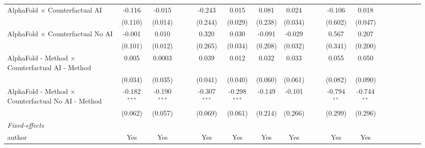 \begin{tabular}{lcccccccccccccccccc}
   AlphaFold $\times$ Counterfactual AI                       & -0.116         & -0.015         &     &     & -0.243         & 0.015          & 0.081       & 0.024   &     &      & -0.106        & 0.018         &      &      &      &      &      &   \\   
                                                              & (0.110)        & (0.014)        &     &     & (0.244)        & (0.029)        & (0.238)     & (0.034) &     &      & (0.602)       & (0.047)       &      &      &      &      &      &   \\   
   AlphaFold $\times$ Counterfactual No AI                    & -0.001         & 0.010          &     &     & 0.320          & 0.030          & -0.091      & -0.029  &     &      & 0.567         & 0.207         &      &      &      &      &      &   \\   
                                                              & (0.101)        & (0.012)        &     &     & (0.265)        & (0.034)        & (0.208)     & (0.032) &     &      & (0.341)       & (0.200)       &      &      &      &      &      &   \\   
   AlphaFold - Method $\times$ Counterfactual AI - Method     & 0.005          & 0.0003         &     &     & 0.039          & 0.012          & 0.032       & 0.033   &     &      & 0.055         & 0.050         &      &      &      &      &      &   \\   
                                                              & (0.034)        & (0.035)        &     &     & (0.041)        & (0.040)        & (0.060)     & (0.061) &     &      & (0.082)       & (0.090)       &      &      &      &      &      &   \\   
   AlphaFold - Method $\times$ Counterfactual No AI - Method  & -0.182$^{***}$ & -0.190$^{***}$ &     &     & -0.307$^{***}$ & -0.298$^{***}$ & -0.149      & -0.101  &     &      & -0.794$^{**}$ & -0.744$^{**}$ &      &      &      &      &      &   \\   
                                                              & (0.062)        & (0.057)        &     &     & (0.069)        & (0.061)        & (0.214)     & (0.266) &     &      & (0.299)       & (0.296)       &      &      &      &      &      &   \\   
   \midrule
   \emph{Fixed-effects}\\
   author                                                     & Yes            & Yes            &     &     & Yes            & Yes            & Yes         & Yes     &     &      & Yes           & Yes           &      &      &      &      &      & \\  

\end{tabular}

